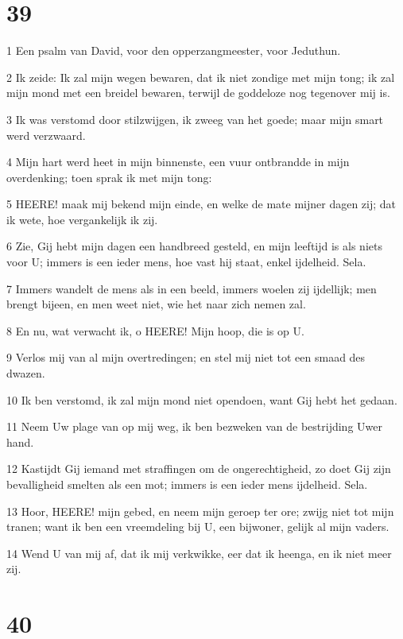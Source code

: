 \chapter{39}

\par 1 Een psalm van David, voor den opperzangmeester, voor Jeduthun.
\par 2 Ik zeide: Ik zal mijn wegen bewaren, dat ik niet zondige met mijn tong; ik zal mijn mond met een breidel bewaren, terwijl de goddeloze nog tegenover mij is.
\par 3 Ik was verstomd door stilzwijgen, ik zweeg van het goede; maar mijn smart werd verzwaard.
\par 4 Mijn hart werd heet in mijn binnenste, een vuur ontbrandde in mijn overdenking; toen sprak ik met mijn tong:
\par 5 HEERE! maak mij bekend mijn einde, en welke de mate mijner dagen zij; dat ik wete, hoe vergankelijk ik zij.
\par 6 Zie, Gij hebt mijn dagen een handbreed gesteld, en mijn leeftijd is als niets voor U; immers is een ieder mens, hoe vast hij staat, enkel ijdelheid. Sela.
\par 7 Immers wandelt de mens als in een beeld, immers woelen zij ijdellijk; men brengt bijeen, en men weet niet, wie het naar zich nemen zal.
\par 8 En nu, wat verwacht ik, o HEERE! Mijn hoop, die is op U.
\par 9 Verlos mij van al mijn overtredingen; en stel mij niet tot een smaad des dwazen.
\par 10 Ik ben verstomd, ik zal mijn mond niet opendoen, want Gij hebt het gedaan.
\par 11 Neem Uw plage van op mij weg, ik ben bezweken van de bestrijding Uwer hand.
\par 12 Kastijdt Gij iemand met straffingen om de ongerechtigheid, zo doet Gij zijn bevalligheid smelten als een mot; immers is een ieder mens ijdelheid. Sela.
\par 13 Hoor, HEERE! mijn gebed, en neem mijn geroep ter ore; zwijg niet tot mijn tranen; want ik ben een vreemdeling bij U, een bijwoner, gelijk al mijn vaders.
\par 14 Wend U van mij af, dat ik mij verkwikke, eer dat ik heenga, en ik niet meer zij.

\chapter{40}

